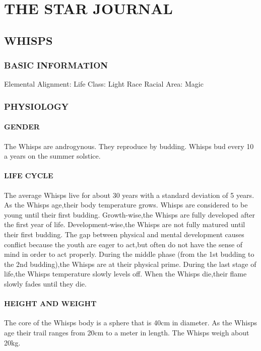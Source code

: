 \chapter{THE STAR JOURNAL}
\section{WHISPS}
\subsection{BASIC INFORMATION}
Elemental Alignment: Life
Class: Light Race
Racial Area: Magic
\subsection{PHYSIOLOGY}
\subsubsection{GENDER}
The Whisps are androgynous.  They reproduce by budding.  Whisps bud every 10 a years on the summer solstice.
\subsubsection{LIFE CYCLE}
The average Whisps live for about 30 years with a standard deviation of 5 years.  As the Whisps age,their body temperature grows.  Whisps are considered to be young until their first budding.  Growth-wise,the Whisps are fully developed after the first year of life.  Development-wise,the Whisps are not fully matured until their first budding.  The gap between physical and mental development causes conflict because the youth are eager to act,but often do not have the sense of mind in order to act properly.  During the middle phase (from the 1st budding to the 2nd budding),the Whisps are at their physical prime.  During the last stage of life,the Whisps temperature slowly levels off.  When the Whisps die,their flame slowly fades until they die.
\subsubsection{HEIGHT AND WEIGHT}
The core of the Whisps body is a sphere that is 40cm in diameter.  As the Whisps age their trail ranges from 20cm to a meter in length.  The Whisps weigh about 20kg.
